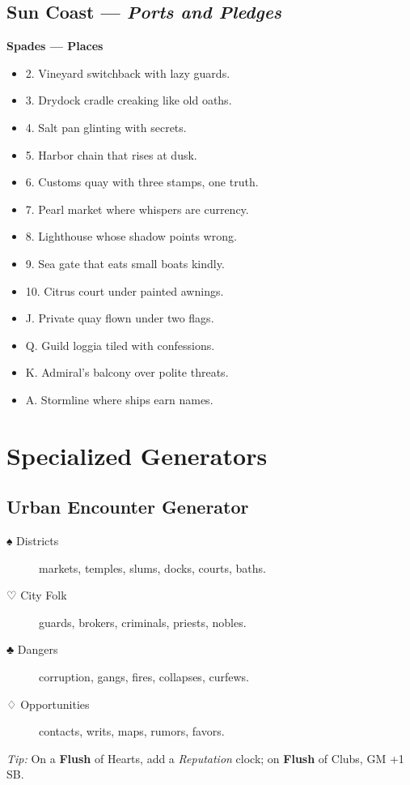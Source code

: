 \begin{multicols}{2}
\subsection*{Sun Coast — \textit{Ports and Pledges}}
\textbf{Spades — Places}
\begin{itemize}
  \item 2. Vineyard switchback with lazy guards.
  \item 3. Drydock cradle creaking like old oaths.
  \item 4. Salt pan glinting with secrets.
  \item 5. Harbor chain that rises at dusk.
  \item 6. Customs quay with three stamps, one truth.
  \item 7. Pearl market where whispers are currency.
  \item 8. Lighthouse whose shadow points wrong.
  \item 9. Sea gate that eats small boats kindly.
  \item 10. Citrus court under painted awnings.
  \item J. Private quay flown under two flags.
  \item Q. Guild loggia tiled with confessions.
  \item K. Admiral’s balcony over polite threats.
  \item A. Stormline where ships earn names.
\end{itemize}

\section{Specialized Generators}

\subsection*{Urban Encounter Generator}
\begin{description}
  \item[♠ Districts] markets, temples, slums, docks, courts, baths.
  \item[♡ City Folk] guards, brokers, criminals, priests, nobles.
  \item[♣ Dangers] corruption, gangs, fires, collapses, curfews.
  \item[♢ Opportunities] contacts, writs, maps, rumors, favors.
\end{description}
\emph{Tip:} On a \textbf{Flush} of Hearts, add a \emph{Reputation} clock; on \textbf{Flush} of Clubs, GM +1 SB.


\end{multicols}
